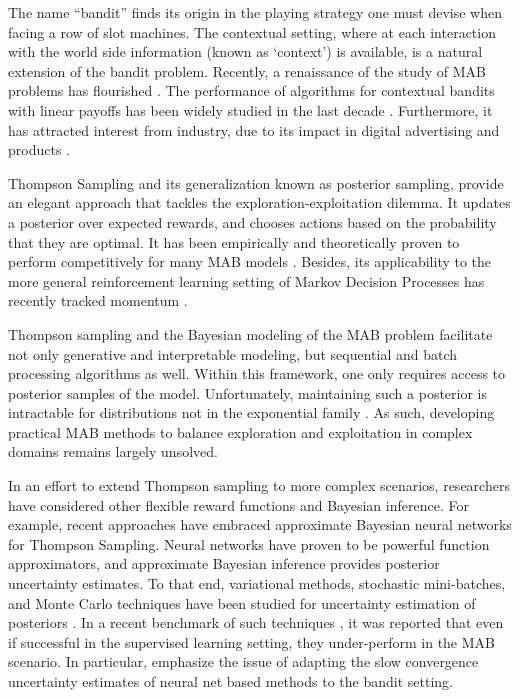 \documentclass{article}
\begin{document}
The name ``bandit'' finds its origin in the playing strategy one must devise when facing a row of slot machines. The contextual setting, where at each interaction with the world side information (known as `context') is available, is a natural extension of the bandit problem. Recently, a renaissance of the study of MAB problems has flourished \cite{j-Scott2010,j-Agrawal2011,ip-Maillard2011}. The performance of algorithms for contextual bandits with linear payoffs \cite{j-Rusmevichientong2010, ip-Chu2011} has been widely studied in the last decade \cite{ic-Langford2008,j-Cesa-Bianchi2011,ic-Abbasi-Yadkori2011}. Furthermore, it has attracted interest from industry, due to its impact in digital advertising and products \cite{j-Li2010, ic-Chapelle2011}. 

Thompson Sampling \cite{j-Thompson1933, j-Russo2018} and its generalization known as posterior sampling, provide an elegant approach that tackles the exploration-exploitation dilemma. It updates a posterior over expected rewards, and chooses actions based on the probability that they are optimal. It has been empirically and theoretically proven to perform competitively for many MAB models \cite{ic-Chapelle2011,j-Scott2015,j-Agrawal2012,j-Agrawal2012a,ic-Korda2013,j-Russo2014,j-Russo2016}. Besides, its applicability to the more general reinforcement learning setting of Markov Decision Processes \cite{j-Burnetas1997} has recently tracked momentum \cite{ip-Gopalan2015,ic-Ouyang2017}.

Thompson sampling and the Bayesian modeling of the MAB problem facilitate not only generative and interpretable modeling, but sequential and batch processing algorithms as well. Within this framework, one only requires access to posterior samples of the model. Unfortunately, maintaining such a posterior is intractable for distributions not in the exponential family \cite{ic-Korda2013}. As such, developing practical MAB methods to balance exploration and exploitation in complex domains remains largely unsolved.

In an effort to extend Thompson sampling to more complex scenarios, researchers have considered other flexible reward functions and Bayesian inference. 
For example, recent approaches have embraced approximate Bayesian neural networks for Thompson Sampling. Neural networks have proven to be powerful function approximators, and approximate Bayesian inference provides posterior uncertainty estimates. To that end, variational methods, stochastic mini-batches, and Monte Carlo techniques have been studied for uncertainty estimation of posteriors \cite{ip-Blundell2015, ic-Kingma2015, j-Lipton2016, ic-Osband2016, ip-Li2016}. In a recent benchmark of such techniques \cite{ip-Riquelme2018}, it was reported that even if successful in the supervised learning setting, they under-perform in the MAB scenario. In particular, \citet{ip-Riquelme2018} emphasize the issue of adapting the slow convergence uncertainty estimates of neural net based methods to the bandit setting.
\end{document}
